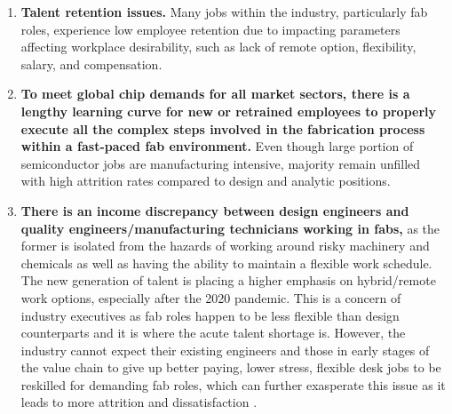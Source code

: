 \begin{enumerate}
\item \textbf{Talent retention issues.} Many jobs within the industry, particularly fab roles, experience low employee retention due to impacting parameters affecting workplace desirability, such as lack of remote option, flexibility, salary, and compensation.

\item \textbf{To meet global chip demands for all market sectors, there is a lengthy learning curve for new or retrained employees to properly execute all the complex steps involved in the fabrication process within a fast-paced fab environment.} Even though large portion of semiconductor jobs are manufacturing intensive, majority remain unfilled with high attrition rates compared to design and analytic positions. 

\item \textbf{There is an income discrepancy between design engineers and quality engineers/manufacturing technicians working in fabs,} as the former is isolated from the hazards of working around risky machinery and chemicals as well as having the ability to maintain a flexible work schedule. The new generation of talent is placing a higher emphasis on hybrid/remote work options, especially after the 2020 pandemic. This is a concern of industry executives as fab roles happen to be less flexible than design counterparts and it is where the acute talent shortage is. However, the industry cannot expect their existing engineers and those in early stages of the value chain to give up better paying, lower stress, flexible desk jobs to be reskilled for demanding fab roles, which can further exasperate this issue as it leads to more attrition and dissatisfaction \cite{Alam2023-hc}.

\end{enumerate}

